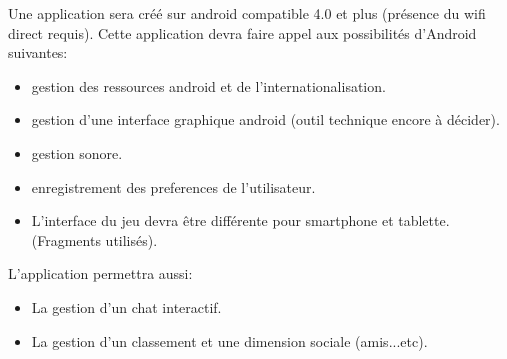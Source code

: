 \documentclass[pdftex,12pt,a4paper]{report}
\begin{document}
\textnormal{
 Une application sera créé sur android compatible 4.0 et plus (présence du wifi direct requis).
 Cette application devra faire appel aux possibilités d'Android suivantes:}
 
 \begin{itemize}
\item \textnormal{gestion des ressources android et de l'internationalisation.}
\item \textnormal{gestion d'une interface graphique android (outil technique encore à décider).}
\item \textnormal{gestion sonore.}
\item \textnormal{enregistrement des preferences de l'utilisateur.}
\item \textnormal{L'interface du jeu devra être différente pour smartphone et tablette.(Fragments utilisés).}
\end{itemize}

 \textnormal{L'application permettra aussi:}
\begin{itemize}
\item \textnormal{La gestion d'un chat interactif.}
\item \textnormal{La gestion d'un classement et une dimension sociale (amis...etc).}
\end{itemize}
\end{document}
